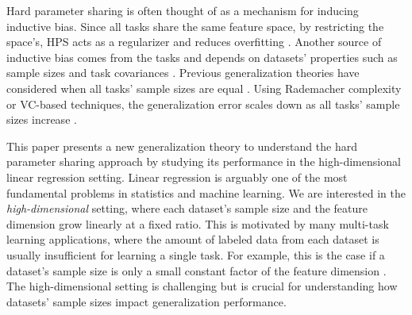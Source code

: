 Hard parameter sharing is often thought of as a mechanism for inducing inductive bias.
Since all tasks share the same feature space, by restricting the space's, HPS acts as a regularizer and reduces overfitting \cite{KD12,WZR20}.
Another source of inductive bias comes from the tasks and depends on datasets' properties such as sample sizes and task covariances \cite{WZR20}.
Previous generalization theories have considered when all tasks' sample sizes are equal \cite{B00,MPR16}.
Using Rademacher complexity or VC-based techniques, the generalization error scales down as all tasks' sample sizes increase \cite{AZ05,M06}.


This paper presents a new generalization theory to understand the hard parameter sharing approach by studying its performance in the high-dimensional linear regression setting.
Linear regression is arguably one of the most fundamental problems in statistics and machine learning.
We are interested in the \textit{high-dimensional} setting, where each dataset's sample size and the feature dimension grow linearly at a fixed ratio.
This is motivated by many multi-task learning applications, where the amount of labeled data from each dataset is usually insufficient for learning a single task.
For example, this is the case if a dataset's sample size is only a small constant factor of the feature dimension \cite{socher2013recursive}.
The high-dimensional setting is challenging but is crucial for understanding how datasets' sample sizes impact generalization performance.
